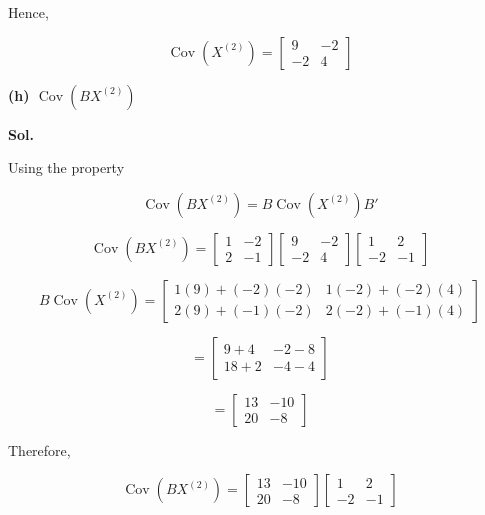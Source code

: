 \documentclass[12pt]{article}
\begin{document}
\vspace{0.3cm}

\noindent
Hence,

\vspace{0.3cm}

\[
\boxed{
\operatorname{Cov}(X^{(2)})
=
\begin{bmatrix}
9 & -2\\
-2 & 4
\end{bmatrix}
}
\]

\vspace{1cm}

\noindent
\textbf{(h) \(\operatorname{Cov}(BX^{(2)})\)}

\vspace{0.5cm}

\noindent
\textbf{Sol.}

\vspace{0.3cm}

\noindent
Using the property

\[
\operatorname{Cov}(BX^{(2)})
=
B\operatorname{Cov}(X^{(2)})B'
\]

\[
\operatorname{Cov}(BX^{(2)})
=
\begin{bmatrix}
1 & -2\\
2 & -1
\end{bmatrix}
\begin{bmatrix}
9 & -2\\
-2 & 4
\end{bmatrix}
\begin{bmatrix}
1 & 2\\
-2 & -1
\end{bmatrix}
\]

\[
B\operatorname{Cov}(X^{(2)})
=
\begin{bmatrix}
1(9)+(-2)(-2) & 1(-2)+(-2)(4)\\
2(9)+(-1)(-2) & 2(-2)+(-1)(4)
\end{bmatrix}
\]

\[
=
\begin{bmatrix}
9+4 & -2-8\\
18+2 & -4-4
\end{bmatrix}
\]

\[
=
\begin{bmatrix}
13 & -10\\
20 & -8
\end{bmatrix}
\]

\noindent
Therefore,

\[
\operatorname{Cov}(BX^{(2)})
=
\begin{bmatrix}
13 & -10\\
20 & -8
\end{bmatrix}
\begin{bmatrix}
1 & 2\\
-2 & -1
\end{bmatrix}
\]
\end{document}
